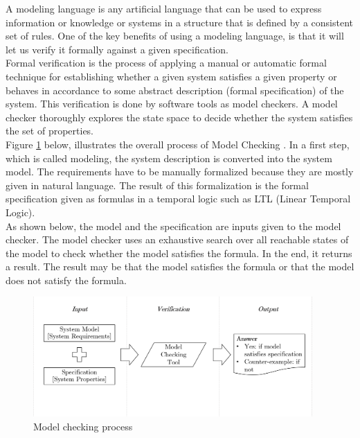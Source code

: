A modeling language is any artificial language that can be used to express information or knowledge or systems in a structure that is defined by a consistent set of rules. One of the key benefits of using a modeling language, is that it will let us verify it formally against a given specification. \\ 

Formal verification is the process of applying a manual or automatic formal technique for establishing whether a given system satisfies a given property or behaves in accordance to some abstract description (formal specification) of the system. This verification is done by software tools as model checkers. A model checker thoroughly explores the state space to decide whether the system satisfies the set of properties. \\

Figure \ref{modelChecking} below, illustrates the overall process of Model Checking \cite{Chan1998}. In a first step, which is called modeling, the system description is converted into the system model. The requirements have to be manually formalized because they are mostly given in natural language. The result of this formalization is the formal specification given as formulas in a temporal logic such as LTL (Linear Temporal Logic). \\

As shown below, the model and the specification are inputs given to the model checker. The model checker uses an exhaustive search over all reachable states of the model to check whether the model satisfies the formula. In the end, it returns a result. The result may be that the model satisfies the formula or that the model does not satisfy the formula.  \\

\begin{figure}[H]
\centering
\includegraphics[width=0.95\textwidth]{image/ModelChecking}
\caption{Model checking process}
\label{modelChecking}
\end{figure}

